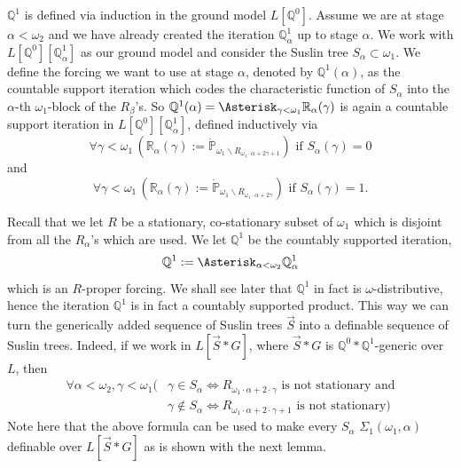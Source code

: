 \documentclass[a4paper,11pt]{article}
\newcommand{\forceP}{\mathbb{P}}
\newcommand{\forceQ}{\mathbb{Q}}
\newcommand{\forceR}{\mathbb{R}}
\begin{document}
$\forceQ^1$ is defined via induction in the ground model $L[\forceQ^0]$. Assume we are at stage $\alpha < \omega_2$ and we have already created the iteration $\forceQ^1_{\alpha}$ up to stage $\alpha$. We work with $L[\forceQ^0][\forceQ^1_{\alpha}]$ as our ground model
 and consider the Suslin tree $S_{\alpha} \subset \omega_1$. 
 We define the forcing we want to use at stage $\alpha$, denoted by $\forceQ^1 (\alpha)$, as the countable support iteration which codes the characteristic function of $S_{\alpha}$ into the $\alpha$-th $\omega_1$-block of the $R_{\beta}$'s. So $\forceQ^1 (\alpha)= \Asterisk_{\gamma < \omega_1} \forceR_{\alpha}(\gamma)$ is again a countable support iteration in $L[\forceQ^0][\forceQ^1_{\alpha}]$, defined inductively via
\[ \forall \gamma < \omega_1 \,(\forceR_{\alpha}(\gamma):= \dot{\forceP}_{\omega_1 \backslash R_{\omega_1 \cdot \alpha + 2 \gamma +1}}) \text{ if } S_{\alpha} (\gamma) =0 \]
and
\[ \forall \gamma < \omega_1 \, (\forceR_{\alpha}(\gamma):= \dot{\forceP}_{\omega_1 \backslash R_{\omega_1 \cdot \alpha + 2 \gamma}}) \text{ if } S_{\alpha} (\gamma) =1. \]


Recall that we let $R$ be a stationary, co-stationary subset of $\omega_1$ which is disjoint from all the $R_{\alpha}$'s which are used.  We let $\mathbb{Q}^1$ be the countably supported iteration, $$\mathbb{Q}^1:=\Asterisk_{\alpha< \omega_2} \forceQ^1_{\alpha}$$ which is an $R$-proper forcing. We shall see later that $\forceQ^1$ in fact is $\omega$-distributive, hence the iteration $\forceQ^1$ is in fact a countably supported product.
This way we can turn the generically added sequence of Suslin trees $\vec{S}$ into a definable sequence of Suslin trees.
Indeed, if we work in $L[\vec{S}\ast G]$, where $\vec{S} \ast G$ is $\forceQ^0 \ast \mathbb{Q}^1$-generic over $L$, then
\begin{align*}
\forall \alpha< \omega_2, \gamma < \omega_1 (&\gamma \in S_{\alpha} \Leftrightarrow R_{\omega_1 \cdot \alpha + 2 \cdot \gamma} \text{ is not stationary and} \\ &
\gamma \notin S_{\alpha} \Leftrightarrow  R_{\omega_1 \cdot \alpha + 2 \cdot \gamma +1} \text{ is not stationary})
\end{align*}
Note here that the above formula can be used to make every $S_{\alpha}$ $\Sigma_1(\omega_1,\alpha)$ definable over $L[\vec{S} \ast G]$ as is shown with the next lemma.
\end{document}
